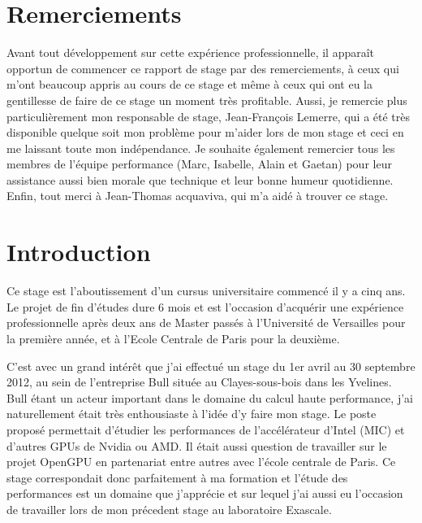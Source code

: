 \documentclass[11pt]{article}
\begin{document}
\newpage
\listoffigures

\newpage
{}
\part{Remerciements}
	Avant tout développement sur cette expérience professionnelle, il apparaît opportun de commencer ce rapport de stage par 
	des remerciements, à ceux qui m'ont beaucoup appris au cours de ce stage et même à ceux qui ont eu la gentillesse de faire 
	de ce stage un moment très profitable. Aussi, je remercie plus particulièrement mon responsable de stage, Jean-François Lemerre, 
	qui a été très disponible quelque soit mon problème pour m'aider lors de mon stage et ceci en me laissant toute mon 
	indépendance. \newline
	Je souhaite également remercier tous les membres de l'équipe performance (Marc, Isabelle, Alain et Gaetan) pour leur assistance 
	aussi bien morale que technique et leur bonne humeur quotidienne. \newline
	Enfin, tout merci à Jean-Thomas acquaviva, qui m'a aidé à trouver ce stage.

\newpage
{}
\part{Introduction}
	Ce stage est l'aboutissement d'un cursus universitaire commencé il y a cinq ans. Le projet de fin
	d'études dure 6 mois et est l'occasion d'acquérir une expérience professionnelle après deux ans
	de Master passés à l'Université de Versailles pour la première année, et à l'Ecole Centrale de Paris pour la deuxième. \newline

	C'est avec un grand intérêt que j’ai effectué un stage du 1er avril au 30 septembre 2012, au sein de l’entreprise Bull située au Clayes-sous-bois 
	dans les Yvelines. Bull étant un acteur important dans le domaine du calcul haute performance, j'ai naturellement 
	était très enthousiaste à l'idée d'y faire mon stage. Le poste proposé permettait d'étudier les performances de 
	l'accélérateur d'Intel (MIC) et d'autres GPUs de Nvidia ou AMD. Il était aussi question de travailler sur le projet 
	OpenGPU en partenariat entre autres avec l'école centrale de Paris. Ce stage correspondait donc parfaitement à ma formation et 
	l'étude des performances est un domaine que j'apprécie et sur lequel j'ai aussi eu l'occasion de travailler lors de 
	mon précedent stage au laboratoire Exascale. \newline
	
\end{document}
